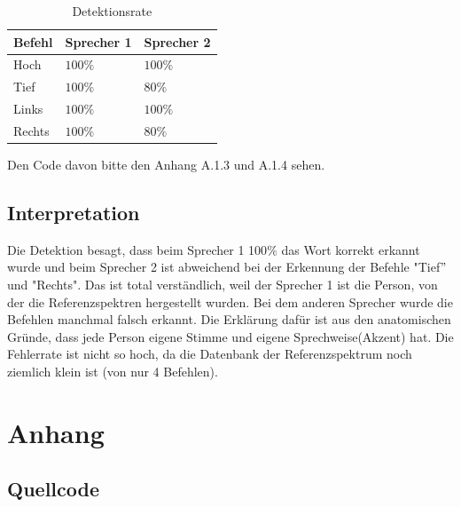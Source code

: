 \documentclass[12pt, oneside, a4paper, \docLanguage]{report}
\begin{document}
\begin{table}[H]
\centering
\begin{tabular}{|l|l|l|}
\hline
\multicolumn{1}{|c|}{Befehl} & \multicolumn{1}{c|}{Sprecher 1}		& \multicolumn{1}{c|}{Sprecher 2}			\\ \hline
Hoch						&$100\%$				&$100\%$				\\ \hline
Tief						&$100\%$				&$80\%$					\\ \hline
Links						&$100\%$				&$100\%$				\\ \hline
Rechts						&$100\%$				&$80\%$					\\ \hline
\end{tabular}
\caption{Detektionsrate}
\end{table}



Den Code davon bitte den Anhang A.1.3 und A.1.4 sehen.

\section{Interpretation}
\label{chap:VERSUCH_2_INTERPRETATION}
\qquad Die Detektion besagt, dass beim Sprecher 1 100$\%$ das Wort korrekt erkannt wurde und beim Sprecher 2 ist abweichend bei der Erkennung der Befehle "Tief$"$ und "Rechts". Das ist total verständlich, weil der Sprecher 1 ist die Person, von der die Referenzspektren hergestellt wurden. Bei dem anderen Sprecher wurde die Befehlen manchmal falsch erkannt. Die Erklärung dafür ist aus den anatomischen Gründe, dass jede Person eigene Stimme und eigene Sprechweise(Akzent) hat. Die Fehlerrate ist nicht so hoch, da die Datenbank der Referenzspektrum noch ziemlich klein ist (von nur 4 Befehlen).

%
%
\renewcommand\thesection{A.\arabic{section}}
\renewcommand\thesubsection{\thesection.\arabic{subsection}}

\chapter*{Anhang}
\label{chap:APPENDIX}
\addtocounter{chapter}{1}
\setcounter{section}{0}

\section{Quellcode}
\label{chap:APPENDIX_SOURCECODE}
\end{document}

